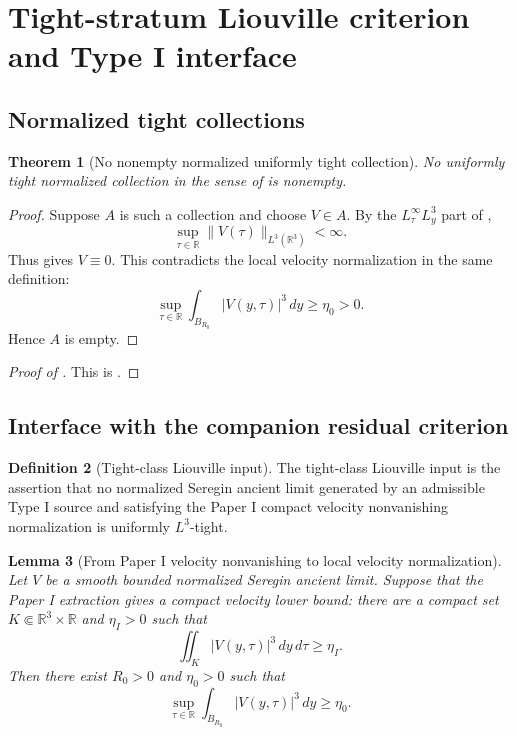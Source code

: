 \documentclass[11pt]{amsart}
\theoremstyle{plain}
\newtheorem{theorem}{Theorem}[section]
\newtheorem{lemma}[theorem]{Lemma}
\theoremstyle{definition}
\newtheorem{definition}[theorem]{Definition}
\theoremstyle{remark}
\numberwithin{equation}{section}
\newcommand{\R}{\mathbb R}
\begin{document}
\section{Tight-stratum Liouville criterion and Type I interface}
\label{sec:tight-liouville-interface}

\subsection{Normalized tight collections}

\begin{theorem}[No nonempty normalized uniformly tight collection]
\label{thm:no-tight-normalized-collection}
No uniformly tight normalized collection in the sense of
 is nonempty.
\end{theorem}

\begin{proof}
Suppose \(A\) is such a collection and choose \(V\in A\).  By the
\(L^\infty_\tau L^3_y\) part of ,
\[
   \sup_{\tau\in\R}\|V(\tau)\|_{L^3(\R^3)}<\infty .
\]
Thus  gives \(V\equiv0\).  This contradicts the
local velocity normalization in the same definition:
\[
   \sup_{\tau\in\R}
   \int_{B_{R_0}}|V(y,\tau)|^3\,dy\ge\eta_0>0 .
\]
Hence \(A\) is empty.
\end{proof}

\begin{proof}[Proof of ]
This is .
\end{proof}

\subsection{Interface with the companion residual criterion}

\begin{definition}[Tight-class Liouville input]
\label{def:tight-class-input}
The tight-class Liouville input is the assertion that no normalized Seregin
ancient limit generated by an admissible Type I source and satisfying the
Paper I compact velocity nonvanishing normalization is uniformly \(L^3\)-tight.
\end{definition}

\begin{lemma}[From Paper I velocity nonvanishing to local velocity normalization]
\label{lem:seregin-to-velocity-nonzero}
Let \(V\) be a smooth bounded normalized Seregin ancient limit.  Suppose that
the Paper I extraction gives a compact velocity lower bound: there are a
compact set \(K\Subset\mathbb R^3\times\mathbb R\) and \(\eta_I>0\) such that
\[
   \iint_K |V(y,\tau)|^3\,dy\,d\tau\ge\eta_I .
\]
Then there exist \(R_0>0\) and \(\eta_0>0\) such that
\[
   \sup_{\tau\in\R}\int_{B_{R_0}}|V(y,\tau)|^3\,dy\ge\eta_0 .
\]
\end{lemma}
\end{document}
